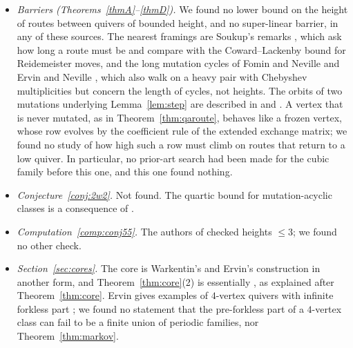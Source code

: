 \documentclass[11pt]{amsart}
\theoremstyle{definition}
\theoremstyle{remark}
\begin{document}
\begin{itemize}
\item \emph{Barriers (Theorems~\ref{thmA}--\ref{thmD}).} We found no lower bound on the height of routes between quivers of bounded height, and no super-linear barrier, in any of these sources. The nearest framings are Soukup's remarks \cite[\S4.1--4.2]{Sou}, which ask how long a route must be and compare with the Coward--Lackenby bound for Reidemeister moves, and the long mutation cycles of Fomin and Neville \cite{FN-long} and Ervin and Neville \cite[Ex.~4.34]{EN}, which also walk on a heavy pair with Chebyshev multiplicities but concern the length of cycles, not heights. The orbits of two mutations underlying Lemma~\ref{lem:step} are described in \cite[Thm.~1.3]{Sou} and \cite[\S3]{FN-long}. A vertex that is never mutated, as in Theorem~\ref{thm:qaroute}, behaves like a frozen vertex, whose row evolves by the coefficient rule of the extended exchange matrix; we found no study of how high such a row must climb on routes that return to a low quiver. In particular, no prior-art search had been made for the cubic family before this one, and this one found nothing.
\item \emph{Conjecture~\ref{conj:2w2}.} Not found. The quartic bound for mutation-acyclic classes is a consequence of \cite[Thm.~1.1, Cor.~5.3]{AHJL}.
\item \emph{Computation~\ref{comp:conj55}.} The authors of \cite{AHJL} checked heights $\le3$; we found no other check.
\item \emph{Section~\ref{sec:cores}.} The core is Warkentin's and Ervin's construction in another form, and Theorem~\ref{thm:core}(2) is essentially \cite[Rem.~5.2]{Erv}, as explained after Theorem~\ref{thm:core}. Ervin gives examples of $4$-vertex quivers with infinite forkless part \cite[\S3]{Erv}; we found no statement that the pre-forkless part of a $4$-vertex class can fail to be a finite union of periodic families, nor Theorem~\ref{thm:markov}.
\end{itemize}
\end{document}

